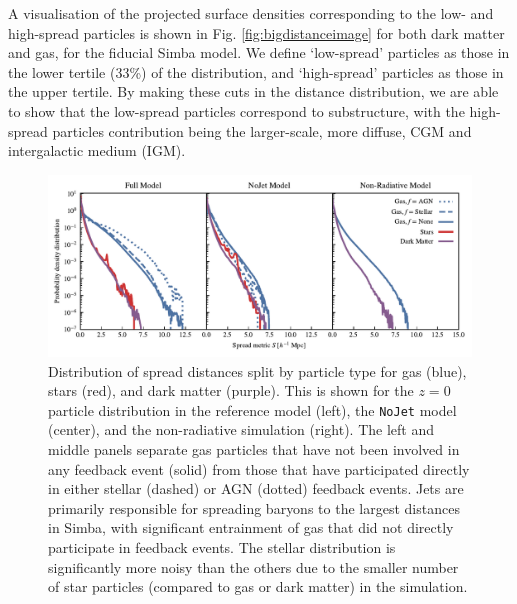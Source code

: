 \documentclass[fleqn,usenatbib]{mnras}
\newcommand{\simba}{{\sc Simba}}
\newcommand{\nojet}{{\tt NoJet}}
\begin{document}
A visualisation of the projected surface densities corresponding to the low-
and high-spread particles is shown in Fig. \ref{fig:bigdistanceimage} for
both dark matter and gas, for the fiducial \simba{} model. We define
`low-spread' particles as those in the lower tertile (33\%) of the
distribution, and `high-spread' particles as those in the upper tertile. By
making these cuts in the distance distribution, we are able to show that the
low-spread particles correspond to substructure, with the high-spread
particles contribution being the larger-scale, more diffuse, CGM and
intergalactic medium (IGM).


\begin{figure}
    \centering
    \includegraphics[width=\textwidth]{figures/neighbour_analysis_feedback_histogram_combined.pdf}
    \vspace{-0.7cm}
    \caption{Distribution of spread distances split by particle type for gas
    (blue), stars (red), and dark matter (purple). This is shown for the
    $z=0$ particle distribution in the reference model (left), the \nojet{}
    model (center), and the non-radiative simulation (right). The left and
    middle panels separate gas particles that have not been involved in any
    feedback event (solid) from those that have participated directly in
    either stellar (dashed) or AGN (dotted) feedback events. Jets are
    primarily responsible for spreading baryons to the largest distances in
    \simba{}, with significant entrainment of gas that did not directly
    participate in feedback events. The stellar distribution is significantly
    more noisy than the others due to the smaller number of star particles
    (compared to gas or dark matter) in the simulation.
    }\label{fig:feedbackdistance}
\end{figure}
\end{document}
